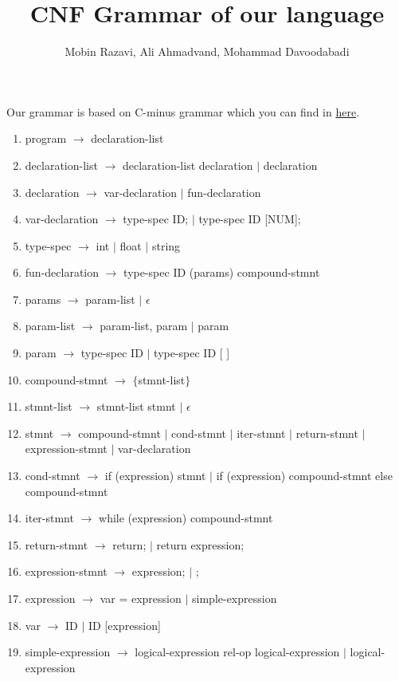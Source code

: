 \documentclass{article}
\begin{document}
\title{CNF Grammar of our language}
\author{Mobin Razavi, Ali Ahmadvand, Mohammad Davoodabadi}
\date{}
\maketitle
Our grammar is based on C-minus grammar which you can find in \href{http://www.csci-snc.com/resources/ExamplesX/C-Syntax.pdf}{here}.
\begin{enumerate}
    \item program $\rightarrow$ declaration-list
    \item declaration-list $\rightarrow$ declaration-list   declaration $|$ declaration
    \item declaration $\rightarrow$ var-declaration $|$ fun-declaration
    \item var-declaration $\rightarrow$ type-spec ID; $|$ type-spec ID [NUM];
    \item type-spec $\rightarrow$ int $|$ float $|$ string
    \item fun-declaration $\rightarrow$ type-spec ID (params) compound-stmnt
    \item params $\rightarrow$ param-list $|$ $\epsilon$ 
    \item param-list $\rightarrow$ param-list, param $|$ param
    \item param $\rightarrow$ type-spec ID $|$ type-spec ID [ ]
    \item compound-stmnt $\rightarrow$ $\{$stmnt-list$\}$
    \item stmnt-list $\rightarrow$ stmnt-list stmnt $|$ $\epsilon$
    \item stmnt $\rightarrow$ compound-stmnt $|$ cond-stmnt $|$ iter-stmnt $|$ return-stmnt $|$ expression-stmnt $|$ var-declaration
    \item cond-stmnt $\rightarrow$ if (expression) stmnt  $|$ if (expression) compound-stmnt else compound-stmnt
    \item iter-stmnt $\rightarrow$ while (expression) compound-stmnt
    \item return-stmnt $\rightarrow$ return; $|$ return expression;
    \item expression-stmnt $\rightarrow$ expression; $|$ ;
    \item expression $\rightarrow$ var = expression $|$ simple-expression
    \item var $\rightarrow$ ID $|$ ID [expression]
    \item simple-expression $\rightarrow$ logical-expression rel-op logical-expression $|$ logical-expression

\end{enumerate}
\end{document}

